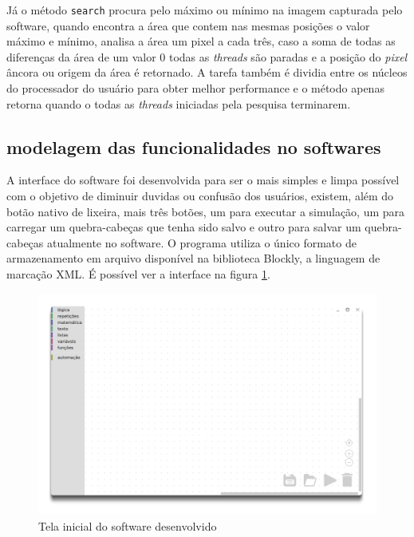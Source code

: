 \documentclass[tg]{mdtufsm}
\begin{document}
                Já o método \texttt{search} procura pelo máximo ou mínimo na imagem capturada pelo software, quando encontra a área que contem nas mesmas posições o valor máximo e mínimo, analisa a área um pixel a cada três, caso a soma de todas as diferenças da área de um valor 0 todas as \emph{threads} são paradas e a posição do \emph{pixel} âncora ou origem da área é retornado. A tarefa também é dividia entre os núcleos do processador do usuário para obter melhor performance e o método apenas retorna quando o todas as \emph{threads} iniciadas pela pesquisa terminarem.

                \subsection {modelagem das funcionalidades no softwares}

                A interface do software foi desenvolvida para ser o mais simples e limpa possível com o objetivo de diminuir duvidas ou confusão dos usuários, existem, além do botão nativo de lixeira, mais três botões, um para executar a simulação, um para carregar um quebra-cabeças que tenha sido salvo e outro para salvar um quebra-cabeças atualmente no software. O programa utiliza o único formato de armazenamento em arquivo disponível na biblioteca Blockly, a linguagem de marcação XML. É possível ver a interface na figura \ref{fig:app}.

                \begin{figure}[!htb]
                    {\centering
                    \includegraphics[width=1.0\textwidth]{imagens/app.png}
                    \caption{Tela inicial do software desenvolvido}
                    \label{fig:app}}
                \end{figure}
\end{document}
